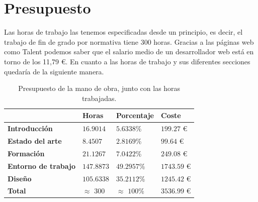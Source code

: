 \newpage

\section{Presupuesto}

Las horas de trabajo las tenemos especificadas desde un principio, es decir, el trabajo de fin de grado por normativa tiene 300 horas. Gracias a las páginas web como Talent podemos saber que el salario medio de un desarrollador web está en torno de los 11,79 €. \cite{Salario-Desarrollador-Web} En cuanto a las horas de trabajo y sus diferentes secciones quedaría de la siguiente manera.

\vspace{0.3cm}

\begin{table}[h]

    \centering
    \setlength\arrayrulewidth{0.8pt}

    \begin{tabular}{| >{\centering\arraybackslash}m{1.2in} | >{\centering\arraybackslash}m{0.8in} | >{\centering\arraybackslash}m{0.8in} | >{\centering\arraybackslash}m{0.8in} |}

        \hline
        \rowcolor{RoyalBlue}
        \textbf{} & \textbf{Horas} & \textbf{Porcentaje} & \textbf{Coste} \\
        \hline
        \cellcolor{RoyalBlue}\textbf{Introducción} & $16.9014$ & $5.6338$\% & $199.27$ € \\
        \hline
        \cellcolor{RoyalBlue}\textbf{Estado del arte} & $8.4507$ & $2.8169$\% & $99.64$ € \\
        \hline
        \cellcolor{RoyalBlue}\textbf{Formación} & $21.1267$ & $7.0422$\% & $249.08$ € \\
        \hline
        \cellcolor{RoyalBlue}\textbf{Entorno de trabajo} & $147.8873$ & $49.2957$\% & $1743.59$ € \\
        \hline
        \cellcolor{RoyalBlue}\textbf{Diseño} & $105.6338$ & $35.2112$\% & $1245.42$ € \\
        \hline
        \cellcolor{RoyalBlue}\textbf{Total} & $\approx$ $300$ & $\approx$ $100$\% & $3536.99$ € \\
        \hline

    \end{tabular}

    \caption[Presupuesto de la mano de obra]{Presupuesto de la mano de obra, junto con las horas trabajadas.}\label{table:presupuesto-obra-de-mano}

\end{table}

